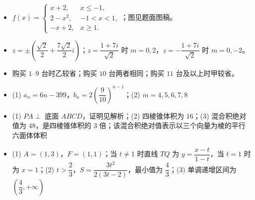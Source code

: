 \begin{itemize}[leftmargin=2.6em]
  \item[\textbf{17.}] $f(x)=\begin{cases}x+2,&x\le-1,\\2-x^2,&-1<x<1,\\-x+2,&x\ge1.\end{cases}$；图见题面图稿。
  \item[\textbf{18.}] $z=\pm\left(\dfrac{\sqrt2}{2}+\dfrac{7\sqrt2}{2}i\right)$；$z=\dfrac{1+7i}{\sqrt2}$ 时 $m=0,2$，$z=-\dfrac{1+7i}{\sqrt2}$ 时 $m=0,-2$。
  \item[\textbf{19.}] 购买 $1$–$9$ 台时乙较省；购买 $10$ 台两者相同；购买 $11$ 台及以上时甲较省。
  \item[\textbf{20.}] (1) $a_n=6n-399$，$b_n=2\left(\dfrac9{10}\right)^{n-1}$；(2) $m=4,5,6,7,8$
  \item[\textbf{21.}] (1) $PA\perp$ 底面 $ABCD$，证明见解析；(2) 四棱锥体积为 $16$；(3) 混合积绝对值为 $48$，是四棱锥体积的 $3$ 倍；该混合积绝对值表示以三个向量为棱的平行六面体体积
  \item[\textbf{22.}] (1) $A=(1,3)$，$F=(1,1)$；当 $t\ne1$ 时直线 $TQ$ 为 $y=\dfrac{x-t}{1-t}$，当 $t=1$ 时为 $x=1$；(2) $t>\dfrac23$，$S=\dfrac{3t^2}{2(3t-2)}$，最小值为 $\dfrac43$；(3) 单调递增区间为 $\left(\dfrac43,+\infty\right)$
\end{itemize}

